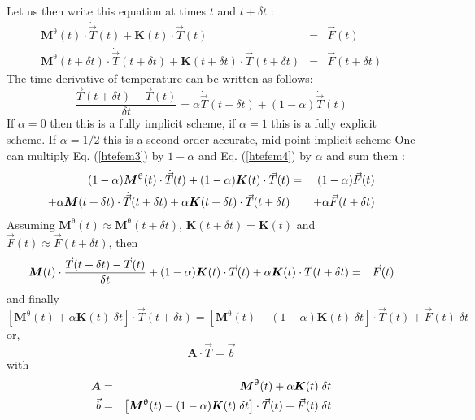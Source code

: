 Let us then write this equation at times $t$ and $t+\delta t$ :
\begin{eqnarray}
{\bm M}^\uptheta(t) \cdot \dot{\vec T}(t) + {\bm K}(t) \cdot \vec T(t) &=& \vec F(t)  \label{htefem3} \\ 
{\bm M}^\uptheta(t+\delta t) \cdot \dot{\vec T}(t+\delta t) + {\bm K}(t+\delta t)\cdot {\vec T}(t+\delta t) &=& {\vec F}(t+\delta t) \label{htefem4} 
\end{eqnarray}
The time derivative of temperature can be written as follows:
\[
\frac{\vec T(t+\delta t)-\vec T(t) }{\delta t} = \alpha \dot{\vec T}(t+\delta t) + (1-\alpha) \dot{\vec T}(t)
\]
If $\alpha=0$ then this is a fully implicit scheme, if $\alpha=1$ this is a fully explicit scheme. 
If $\alpha=1/2$ this is a second order accurate, mid-point implicit scheme 
One can multiply Eq. (\ref{htefem3}) by $1-\alpha$ and Eq. (\ref{htefem4}) by $\alpha$ and sum them :
\begin{eqnarray}
(1-\alpha) {\bm M}^\uptheta(t) \cdot \dot{\vec T}(t) + (1-\alpha){\bm K}(t)\cdot {\vec T}(t)
&=& (1-\alpha){\vec F}(t)  \nonumber\\
+ \alpha  {\bm M}(t+\delta t) \cdot \dot{\vec T}(t+\delta t) 
+ \alpha {\bm K}(t+\delta t)\cdot {\vec T}(t+\delta t) && +  \alpha {\vec F}(t+\delta t) \nonumber 
\end{eqnarray}
Assuming ${\bm M}^\uptheta(t)\approx {\bm M}^\uptheta(t+\delta t)$, ${\bm K}(t+\delta t)={\bm K}(t)$  
and ${\vec F}(t)\approx {\vec F}(t+\delta t)$, then 
\begin{eqnarray}
{\bm M}(t) \cdot \frac{\vec T(t+\delta t)-\vec T(t) }{\delta t} 
+ (1-\alpha){\bm K}(t)\cdot {\vec T}(t)   
+ \alpha {\bm K}(t)\cdot {\vec T}(t+\delta t) 
&=& {\vec F}(t)  \nonumber
\end{eqnarray}
and finally
\[
\left[ {\bm M}^\uptheta(t) + \alpha {\bm K}(t) \; \delta t \right] \cdot  {\vec T}(t+\delta t)
= \left[ {\bm M}^\uptheta(t) - (1-\alpha) {\bm K}(t) \; \delta t \right] \cdot  {\vec T}(t) + {\vec F}(t) \; \delta t
\]
or, 
\[
{\bm A}\cdot {\vec T} = {\vec b}
\]
with 
\begin{eqnarray}
{\bm A} &=& {\bm M}^\uptheta(t) + \alpha {\bm K}(t) \; \delta t  \nonumber\\
{\vec b} &=& \left[ {\bm M}^\uptheta(t) - (1-\alpha) {\bm K}(t) \; \delta t \right] \cdot  {\vec T}(t) + {\vec F}(t) \; \delta t \nonumber
\end{eqnarray}



